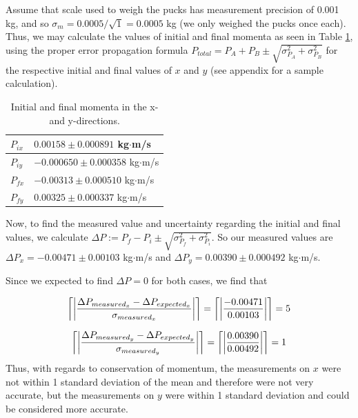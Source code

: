 \documentclass[11pt]{article}
\DeclarePairedDelimiter{\ceil}{\lceil}{\rceil}
\begin{document}
Assume that scale used to weigh the pucks has measurement precision of 0.001 kg, and so $\sigma_m=0.0005/\sqrt{1}=0.0005$ kg (we only weighed the pucks once each). Thus, we may calculate the values of initial and final momenta as seen in Table \ref{tabmom}, using the proper error propagation formula $P_{total} = P_A + P_B \pm \sqrt{\sigma_{P_A}^2+\sigma_{P_B}^2}$ for the respective initial and final values of $x$ and $y$ (see appendix for a sample calculation).

\begin{table}[]
\centering
\caption{Initial and final momenta in the x- and y-directions.}
\label{tabmom}
\begin{tabular}{|l|l|}
\hline
$P_{ix}$ & $0.00158\pm0.000891$ kg$\cdot$m/s   \\ \hline
$P_{iy}$ & $-0.000650\pm 0.000358$ kg$\cdot$m/s \\ \hline
$P_{fx}$ & $-0.00313\pm 0.000510$ kg$\cdot$m/s \\ \hline
$P_{fy}$ & $0.00325 \pm 0.000337$ kg$\cdot$m/s \\ \hline
\end{tabular}
\end{table}

Now, to find the measured value and uncertainty regarding the initial and final values, we calculate $\Delta P := P_{f}-P_{i} \pm \sqrt{\sigma_{P_{f}}^2+\sigma_{P_{i}}^2}$. So our measured values are $\Delta P_x = -0.00471 \pm 0.00103$ kg$\cdot$m/s and $\Delta P_y = 0.00390 \pm 0.000492$ kg$\cdot$m/s.

Since we expected to find $\Delta P = 0$ for both cases, we find that

\begin{align}
\ceil*{\left\vert\frac{\Delta P_{measured_x}-\Delta P_{expected_x}}{\sigma_{measured_x}}\right\vert} = \ceil*{\left\vert\frac{-0.00471}{0.00103}\right\vert} = 5
\label{errPx}
\end{align}

\begin{align}
\ceil*{\left\vert\frac{\Delta P_{measured_y}-\Delta P_{expected_y}}{\sigma_{measured_y}}\right\vert} = \ceil*{\left\vert\frac{0.00390}{0.00492}\right\vert} = 1
\label{errPy}
\end{align}
Thus, with regards to conservation of momentum, the measurements on $x$ were not within 1 standard deviation of the mean and therefore were not very accurate, but the measurements on $y$ were within 1 standard deviation and could be considered more accurate.
\end{document}
